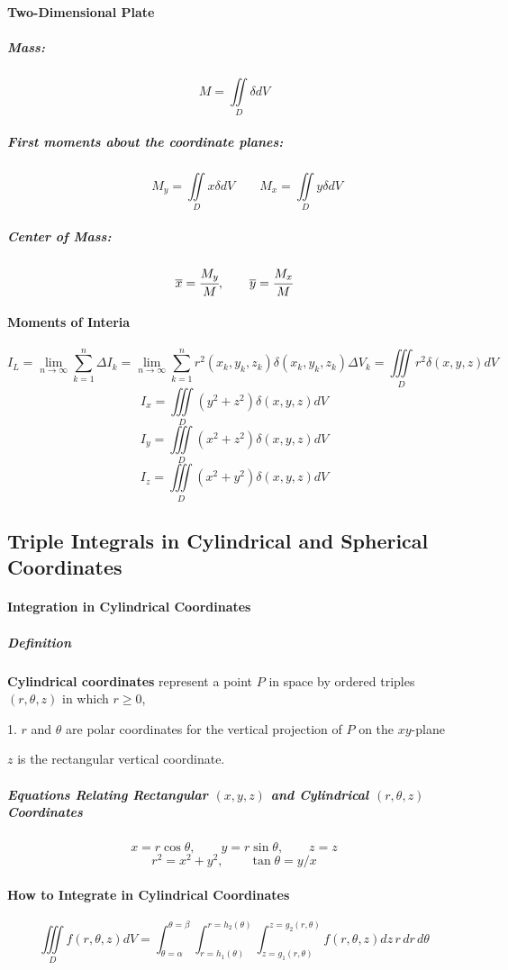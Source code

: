 \documentclass{article}
\begin{document}
            \paragraph{Two-Dimensional Plate}
                \subparagraph{Mass:}
                \[M=\iint\limits_D\delta dV\]
                \subparagraph{First moments about the coordinate planes:}
                \[\qquad M_{y}=\iint\limits_Dx\delta dV\qquad M_{x}=\iint\limits_Dy\delta dV\]
                \subparagraph{Center of Mass:} \[\overline{x}=\cfrac{M_{y}}{M},\qquad \overline{y}=\cfrac{M_{x}}{M}\]
            \paragraph{Moments of Interia}
                \[I_L=\lim\limits_{n\to\infty}\sum_{k=1}^n\Delta I_k=\lim\limits_{n\to\infty}\sum_{k=1}^nr^2(x_k,y_k,z_k)\delta(x_k,y_k,z_k)\Delta V_k=\iiint\limits_Dr^2\delta(x,y,z) dV\]
                \[I_x=\iiint\limits_D(y^2+z^2)\delta(x,y,z)dV\]
                \[I_y=\iiint\limits_D(x^2+z^2)\delta(x,y,z)dV\]
                \[I_z=\iiint\limits_D(x^2+y^2)\delta(x,y,z)dV\]
        \subsection{Triple Integrals in Cylindrical and Spherical Coordinates}
            \paragraph{Integration in Cylindrical Coordinates}
                \subparagraph{Definition} \textbf{Cylindrical coordinates} represent a point $P$ in space by ordered triples $(r,\theta,z)$ in which $r\ge 0$,
                \par 1. $r$ and $\theta$ are polar coordinates for the vertical projection of $P$ on the $xy$-plane
                \par $z$ is the rectangular vertical coordinate.
                \subparagraph{Equations Relating Rectangular $(x,y,z)$ and Cylindrical $(r,\theta,z)$ Coordinates}
                \[x=r\cos\theta,\qquad y=r\sin\theta,\qquad z=z\]
                \[r^2=x^2+y^2,\qquad \tan\theta=y/x\]
            \paragraph{How to Integrate in Cylindrical Coordinates}
                \[\iiint\limits_Df(r,\theta,z)dV=\int_{\theta=\alpha}^{\theta=\beta}\int_{r=h_1(\theta)}^{r=h_2(\theta)}\int_{z=g_1(r,\theta)}^{z=g_2(r,\theta)}f(r,\theta,z)dz\, r\, dr\,d\theta\]
\end{document}
